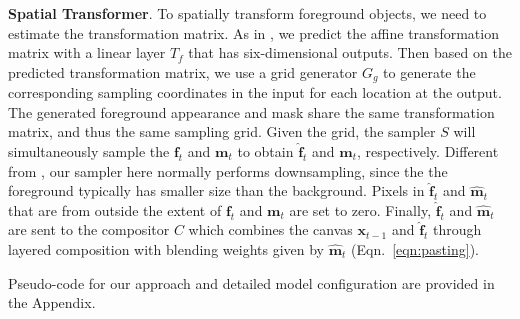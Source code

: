 \documentclass{article} \usepackage{iclr2017_conference,times}
\newcommand*\Let[2]{\State #1 $\gets$ #2}
\begin{document}
\textbf{Spatial Transformer}. To spatially transform foreground objects, 
we need to estimate the transformation matrix. As in \cite{STN}, we predict the affine transformation matrix with a linear layer $T_f$ that has six-dimensional outputs. 
Then based on the predicted transformation matrix, we use a grid generator $G_g$ to generate the corresponding sampling coordinates in the input for each location at the output. 
The generated foreground appearance and mask share the same transformation matrix, and thus the same sampling grid. Given the grid, the sampler $S$ will simultaneously sample the $ \bm{f}_t$ and $\bm{m}_t$ to obtain $\hat{\bm{f}}_t$ and $\hat{\bm{m}}_t$, respectively. Different from \cite{STN}, our sampler here normally performs downsampling, since the the foreground typically has smaller size than the background. Pixels in $\hat{\bm{f}}_t$ and $\hat{\bm{m}}_t$ that are from outside the extent of ${\bm{f}}_t$ and ${\bm{m}}_t$ are set to zero. Finally, $\hat{\bm{f}}_t$ and $\hat{\bm{m}}_t$ are sent to the compositor $C$ which combines the canvas $\bm{x}_{t-1}$ and $\hat{\bm{f}}_t$ through layered composition with blending weights given by $\hat{\bm{m}}_t$ (Eqn.~\ref{eqn:pasting}).

Pseudo-code for our approach and detailed model configuration are provided in the Appendix. 
\begin{comment}
Finally, Algo.~\ref{algorithm} provides the in depth generative process accomplished by the generator. In the algorithm, we define some operators:   $g(\star)$ evaluates the function $g$ at $\star$.  $\circ$ is a composition operator that composes its operands so that $f \circ g(\star) = f(g(\star))$. 
\begin{algorithm}
\caption{Stochastic Data Generation}
\begin{algorithmic}[1]
\State $\bm{z}_0 \sim \mathcal{N}(0,I)$
\State  $\bm{x}_0 = G_b(\bm{z}_0)$ \Comment{background generator} 
\For  {$t \in [1 \cdots T]$ }
\State $\bm{z}_t \sim \mathcal{N}(0,I)$
\Let{$\bm{r}_t$}{LSTM[$\bm{z}_t$]} \Comment{encoding with LSTM} 
\If{t = 1 }
   \Let{$\bm{y}_t$}{$\bm{r}_t$}
  \Else
    \Let{$\bm{y}_t$}{[$\bm{r}_t$  $\bm{h}^{1:{t-1}}_{f}$]} \Comment{concat the two inputs}
 \EndIf
   \Let{$\bm{s}_t$}{ $G_f^{c} \circ L_f^{i} (\bm{y}_t)$} \Comment{ latent shared representation of object layer}
     \Let{$\bm{f}_t$}{ $G_f^{i}  (\bm{s}_t)$} \Comment{ object appearance }
        \Let{$\bm{m}_t$}{ $G_m^{i}  (\bm{s}_t)$} \Comment{ object shape}
        \Let{$a_t$}{$T_f \circ L_f^{i} (\bm{y}_t)$} \Comment{ object transformation}
        \Let{ $\bm{h}^{1:{t}}_{f}$}{ $L_f^{c}\circ P_f^c (\bm{s}_t)$} \Comment{ shared represenation embedding }
        \Let{$\bm{x}_t$}{$ST(\bm{m}_t,a_t) \odot ST(\bm{f}_t,a_t) + (1- ST(\bm{m}_t,a_t)) \odot \bm{x}_{t-1}$}
\EndFor
\end{algorithmic}
\label{algorithm}
\end{algorithm}
\end{comment}
\end{document}
